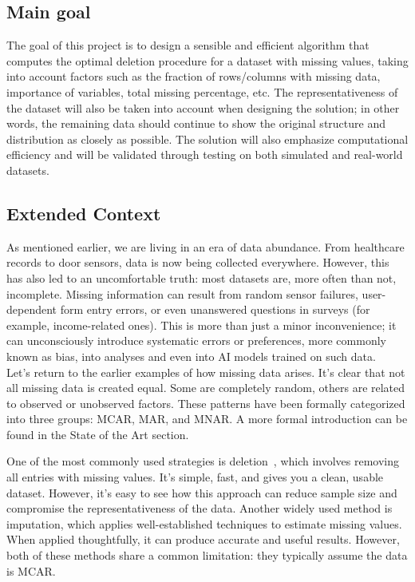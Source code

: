 \documentclass[a4paper,12pt]{article}
\begin{document}
\subsection{Main goal}
The goal of this project is to design a sensible and efficient algorithm that computes the optimal deletion procedure for a dataset with missing values, taking into account factors such as the fraction of rows/columns with missing data, importance of variables, total missing percentage, etc. The representativeness of the dataset will also be taken into account when designing the solution; in other words, the remaining data should continue to show the original structure and distribution as closely as possible. The solution will also emphasize computational efficiency and will be validated through testing on both simulated and real-world datasets.

\subsection{Extended Context}

As mentioned earlier, we are living in an era of data abundance. From healthcare records to door sensors, data is now being collected everywhere. However, this has also led to an uncomfortable truth: most datasets are, more often than not, incomplete. Missing information can result from random sensor failures, user-dependent form entry errors, or even unanswered questions in surveys (for example, income-related ones). This is more than just a minor inconvenience; it can unconsciously introduce systematic errors or preferences, more commonly known as bias, into analyses and even into AI models trained on such data.\\

Let’s return to the earlier examples of how missing data arises. It’s clear that not all missing data is created equal. Some are completely random, others are related to observed or unobserved factors. These patterns have been formally categorized into three groups: MCAR, MAR, and MNAR. A more formal introduction can be found in the State of the Art section.

One of the most commonly used strategies is deletion~\cite{1}, which involves removing all entries with missing values. It’s simple, fast, and gives you a clean, usable dataset. However, it’s easy to see how this approach can reduce sample size and compromise the representativeness of the data. Another widely used method is imputation, which applies well-established techniques to estimate missing values. When applied thoughtfully, it can produce accurate and useful results. However, both of these methods share a common limitation: they typically assume the data is MCAR.\\
\end{document}
